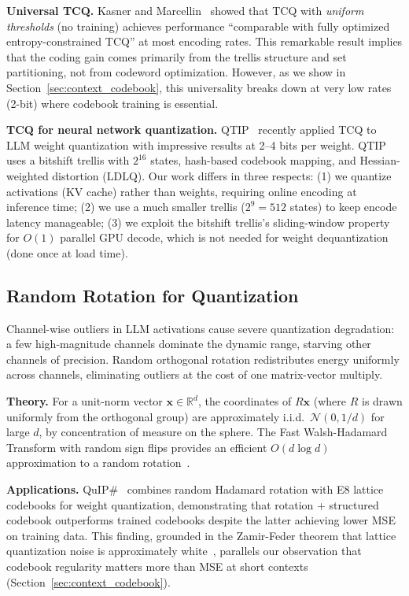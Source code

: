 \documentclass{article}
\newcommand{\R}{\mathbb{R}}
\begin{document}
\textbf{Universal TCQ.} Kasner and Marcellin~\cite{kasner1999utcq} showed
that TCQ with \emph{uniform thresholds} (no training) achieves performance
``comparable with fully optimized entropy-constrained TCQ'' at most encoding
rates. This remarkable result implies that the coding gain comes primarily from
the trellis structure and set partitioning, not from codeword optimization.
However, as we show in Section~\ref{sec:context_codebook}, this universality
breaks down at very low rates (2-bit) where codebook training is essential.

\textbf{TCQ for neural network quantization.} QTIP~\cite{qtip2024} recently
applied TCQ to LLM weight quantization with impressive results at 2--4 bits
per weight. QTIP uses a bitshift trellis with $2^{16}$ states, hash-based
codebook mapping, and Hessian-weighted distortion (LDLQ). Our work differs
in three respects: (1) we quantize activations (KV cache) rather than weights,
requiring online encoding at inference time; (2) we use a much smaller trellis
($2^9 = 512$ states) to keep encode latency manageable; (3) we exploit the
bitshift trellis's sliding-window property for $O(1)$ parallel GPU decode,
which is not needed for weight dequantization (done once at load time).

\subsection{Random Rotation for Quantization}
\label{sec:bg_rotation}

Channel-wise outliers in LLM activations cause severe quantization
degradation: a few high-magnitude channels dominate the dynamic range,
starving other channels of precision. Random orthogonal rotation
redistributes energy uniformly across channels, eliminating outliers at the
cost of one matrix-vector multiply.

\textbf{Theory.} For a unit-norm vector $\mathbf{x} \in \R^d$, the
coordinates of $R\mathbf{x}$ (where $R$ is drawn uniformly from the
orthogonal group) are approximately i.i.d.\ $\mathcal{N}(0, 1/d)$ for large
$d$, by concentration of measure on the sphere. The Fast Walsh-Hadamard
Transform with random sign flips provides an efficient $O(d \log d)$
approximation to a random rotation~\cite{ailon2009fast}.

\textbf{Applications.} QuIP\#~\cite{quipsharp2024} combines random Hadamard
rotation with E8 lattice codebooks for weight quantization, demonstrating
that rotation + structured codebook outperforms trained codebooks despite the
latter achieving lower MSE on training data. This finding, grounded in the
Zamir-Feder theorem that lattice quantization noise is approximately
white~\cite{zamir1996lattice}, parallels our observation that codebook
regularity matters more than MSE at short contexts
(Section~\ref{sec:context_codebook}).
\end{document}
